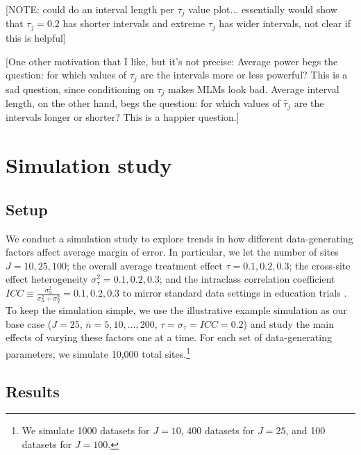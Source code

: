 \documentclass[]{article}
\begin{document}
[NOTE: could do an interval length per $\tau_j$ value plot... essentially would show that $\tau_j=0.2$ has shorter intervals and extreme $\tau_j$ has wider intervals, not clear if this is helpful]

[One other motivation that I like, but it's not precise:
Average power begs the question: for which values of $\tau_j$ are the intervals more or less powerful?
This is a sad question, since conditioning on $\tau_j$ makes MLMs look bad.
Average interval length, on the other hand, begs the question: for which values of $\hat{\tau}_j$ are the intervals longer or shorter?
This is a happier question.]


\section{Simulation study}

\subsection{Setup}

We conduct a simulation study to explore trends in how different data-generating factors affect average margin of error.
In particular, we let the number of sites $J = 10, 25, 100$; the overall average treatment effect $\tau = 0.1, 0.2, 0.3$; the cross-site effect heterogeneity $\sigma^2_\tau = 0.1, 0.2, 0.3$; and the intraclass correlation coefficient $ICC \equiv \frac{\sigma^2_\alpha}{\sigma^2_\alpha + \sigma^2_y} = 0.1, 0.2, 0.3$ to mirror standard data settings in education trials \citep{weiss2017much}.
To keep the simulation simple, we use the illustrative example simulation as our base case ($J=25$, $\bar{n}=5,10,\dots,200$, $\tau=\sigma_\tau=ICC=0.2$) and study the main effects of varying these factors one at a time.
For each set of data-generating parameters, we simulate 10,000 total sites.\footnote{We simulate 1000 datasets for $J=10$, 400 datasets for $J=25$, and 100 datasets for $J=100$.}

\subsection{Results}
\end{document}

